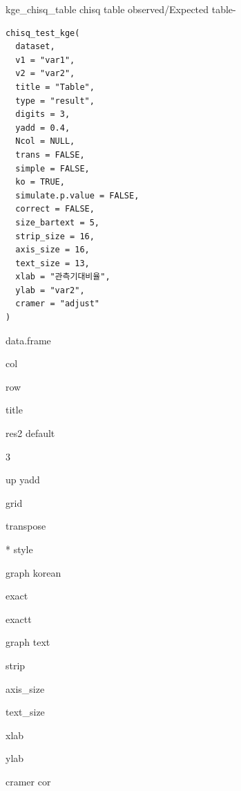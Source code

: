 \documentclass[a4paper]{book}
\begin{document}
%
\begin{Description}
kge\_chisq\_table chisq table observed/Expected table-
\end{Description}
%
\begin{Usage}
\begin{verbatim}
chisq_test_kge(
  dataset,
  v1 = "var1",
  v2 = "var2",
  title = "Table",
  type = "result",
  digits = 3,
  yadd = 0.4,
  Ncol = NULL,
  trans = FALSE,
  simple = FALSE,
  ko = TRUE,
  simulate.p.value = FALSE,
  correct = FALSE,
  size_bartext = 5,
  strip_size = 16,
  axis_size = 16,
  text_size = 13,
  xlab = "관측기대비율",
  ylab = "var2",
  cramer = "adjust"
)
\end{verbatim}
\end{Usage}
%
\begin{Arguments}
\begin{ldescription}
\item[\code{dataset}] data.frame

\item[\code{v1}] col

\item[\code{v2}] row

\item[\code{title}] title

\item[\code{type}] res2 default

\item[\code{digits}] 3

\item[\code{yadd}] up yadd

\item[\code{Ncol}] grid

\item[\code{trans}] transpose

\item[\code{simple}] * style

\item[\code{ko}] graph korean

\item[\code{simulate.p.value}] exact

\item[\code{correct}] exactt

\item[\code{size\_bartext}] graph text

\item[\code{strip\_size}] strip

\item[\code{axis\_size}] axis\_size

\item[\code{text\_size}] text\_size

\item[\code{xlab}] xlab

\item[\code{ylab}] ylab

\item[\code{cramer}] cramer cor
\end{ldescription}
\end{Arguments}
\end{document}
